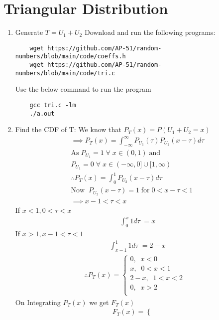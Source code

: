 \documentclass[journal,12pt,twocolumn]{IEEEtran}
\renewcommand\thesection{\arabic{section}}
\begin{document}
\section{Triangular Distribution}
\begin{enumerate}[label=\thesection.\arabic*
,ref=\thesection.\theenumi]

\item Generate $T=U_1+U_2$
\solution Download and run the following programs:
\begin{lstlisting}
    wget https://github.com/AP-51/random-numbers/blob/main/code/coeffs.h
    wget https://github.com/AP-51/random-numbers/blob/main/code/tri.c
\end{lstlisting}
Use the below command to run the program
\begin{lstlisting}
    gcc tri.c -lm
    ./a.out
\end{lstlisting}
\item Find the CDF of T:
\solution We know that $P_T(x)=P(U_1+U_2=x)$
\begin{align}
    &\implies P_T(x)=\int_{-\infty}^{\infty}P_{U_1}(\tau)P_{U_2}(x-\tau)d\tau\\
    &\text{As} \;P_{U_1}=1 \; \forall \; x\in (0,1) \; \text{and}\\
    &P_{U_1}=0 \;\forall \;x\in (-\infty,0]\cup[1,\infty)\\
    &\therefore P_T(x)=\int_{0}^{1}P_{U_2}(x-\tau)d\tau\\
    &\text{Now} \;\; P_{U_2}(x-\tau)=1 \; \text{for} \;0<x-\tau<1\\
    &\implies x-1<\tau<x
\end{align}
If $x<1,0<\tau<x$
\begin{align}
    & \int_{0}^{x}1d\tau\;=x
\end{align}
If $x>1,x-1<\tau<1$
\begin{align}
    & \int_{x-1}^{1}1d\tau\;=2-x
\end{align}
\begin{align}
    \therefore P_T(x)=
    \begin{cases}
    0, \;\; x<0\\
    x, \;\; 0<x<1\\
    2-x, \;\; 1<x<2\\
    0, \;\; x>2\\
    \end{cases}     
\end{align}
On Integrating $P_T(x)$ we get $F_T(x)$
\begin{align}
    F_T(x)=
    \begin{cases}

\end{cases}
\end{align}
\end{enumerate}
\end{document}

